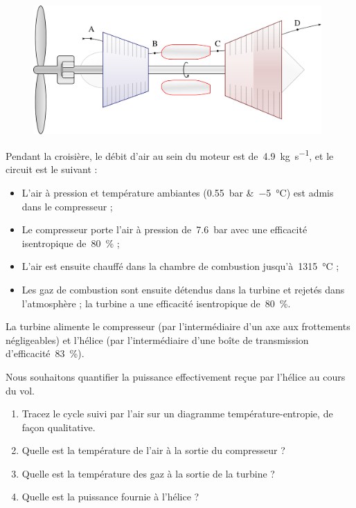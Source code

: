 	\begin{figure}
		\begin{center}
			\includegraphics[width=11cm]{images/circuit_turboprop.png}
		\end{center}
		\label{fig_turboprop_circuit}
	\end{figure}
	
	Pendant la croisière, le débit d’air au sein du moteur est de~\SI{4,9}{\kilogram\per\second}, et le circuit est le suivant :
	\begin{itemize}
		\item L’air à pression et température ambiantes (\SI{0,55}{\bar} \&~\SI{-5}{\degreeCelsius}) est admis dans le compresseur ;
		\item Le compresseur porte l’air à pression de~\SI{7,6}{\bar} avec une efficacité isentropique de~\SI{80}{\percent} ;
		\item L’air est ensuite chauffé dans la chambre de combustion jusqu’à~\SI{1315}{\degreeCelsius} ;
		\item Les gaz de combustion sont ensuite détendus dans la turbine et rejetés dans l’atmosphère ; la turbine a une efficacité isentropique de~\SI{80}{\percent}.
	\end{itemize}
	
	 La turbine alimente le compresseur (par l’intermédiaire d’un axe aux frottements négligeables) et l’hélice (par l’intermédiaire d’une boîte de transmission d’efficacité~\SI{83}{\percent}).
	
	Nous souhaitons quantifier la puissance effectivement reçue par l’hélice au cours du vol.
	
	\begin{enumerate}
		\item Tracez le cycle suivi par l’air sur un diagramme température-entropie, de façon qualitative.
		\item Quelle est la température de l’air à la sortie du compresseur ?
		\item Quelle est la température des gaz à la sortie de la turbine ?
		\item Quelle est la puissance fournie à l’hélice ?
	\end{enumerate}

